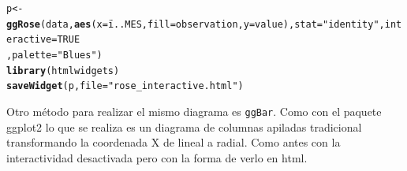 \documentclass{article}\usepackage[]{graphicx}\usepackage[]{color}
\makeatletter
\newcommand{\hlnum}[1]{\textcolor[rgb]{0.686,0.059,0.569}{#1}}%
\newcommand{\hlstr}[1]{\textcolor[rgb]{0.192,0.494,0.8}{#1}}%
\newcommand{\hlstd}[1]{\textcolor[rgb]{0.345,0.345,0.345}{#1}}%
\newcommand{\hlkwb}[1]{\textcolor[rgb]{0.69,0.353,0.396}{#1}}%
\newcommand{\hlkwc}[1]{\textcolor[rgb]{0.333,0.667,0.333}{#1}}%
\newcommand{\hlkwd}[1]{\textcolor[rgb]{0.737,0.353,0.396}{\textbf{#1}}}%
\newenvironment{kframe}{%
 \def\at@end@of@kframe{}%
 \ifinner\ifhmode%
  \def\at@end@of@kframe{\end{minipage}}%
  \begin{minipage}{\columnwidth}%
 \fi\fi%
 \def\FrameCommand##1{\hskip\@totalleftmargin \hskip-\fboxsep
 \colorbox{shadecolor}{##1}\hskip-\fboxsep
     \hskip-\linewidth \hskip-\@totalleftmargin \hskip\columnwidth}%
 \MakeFramed {\advance\hsize-\width
   \@totalleftmargin\z@ \linewidth\hsize
   \@setminipage}}%
 {\par\unskip\endMakeFramed%
 \at@end@of@kframe}
\newenvironment{knitrout}{}{} %
\makeatother
\begin{document}
\begin{knitrout}
\color{fgcolor}\begin{kframe}
\begin{alltt}
\hlstd{p} \hlkwb{<-} \hlkwd{ggRose}\hlstd{(data,}\hlkwd{aes}\hlstd{(}\hlkwc{x}\hlstd{=ï..MES,}\hlkwc{fill}\hlstd{=observation,}\hlkwc{y}\hlstd{=value),}\hlkwc{stat}\hlstd{=}\hlstr{"identity"}\hlstd{,}\hlkwc{interactive}\hlstd{=}\hlnum{TRUE}
       \hlstd{,} \hlkwc{palette} \hlstd{=} \hlstr{"Blues"}\hlstd{)}
\hlkwd{library}\hlstd{(htmlwidgets)}
\hlkwd{saveWidget}\hlstd{(p,} \hlkwc{file} \hlstd{=} \hlstr{"rose_interactive.html"}\hlstd{)}
\end{alltt}
\end{kframe}
\end{knitrout}
\clearpage
Otro m\'etodo para realizar el mismo diagrama es \texttt{ggBar}. Como con el paquete ggplot2 lo que se realiza es un diagrama de columnas apiladas tradicional transformando la coordenada X de lineal a radial. Como antes con la interactividad desactivada pero con la forma de verlo en html.
\end{document}
